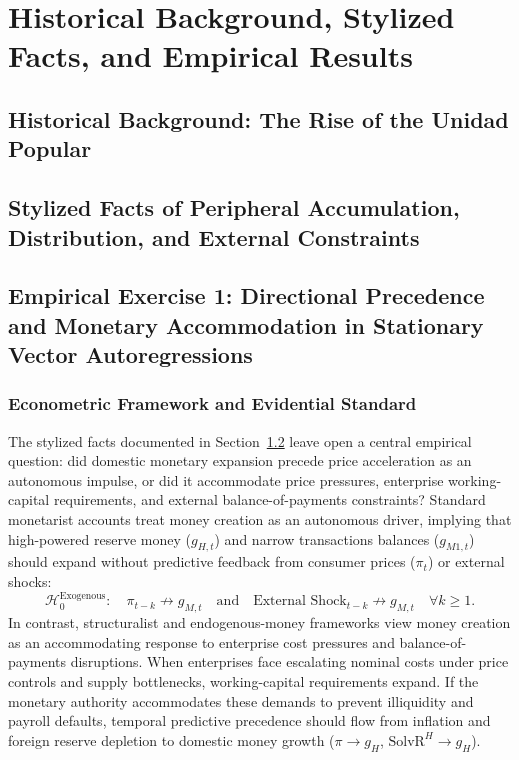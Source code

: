 \section{Historical Background, Stylized Facts, and Empirical Results}
\label{sec:historical_empirical_results}
\label{sec:empirical_tournament}
\label{sec:empirical_results}

\subsection{Historical Background: The Rise of the Unidad Popular}
\label{sec:historical_background}



\subsection{Stylized Facts of Peripheral Accumulation, Distribution, and External Constraints}
\label{sec:stylized_facts}



\subsection{Empirical Exercise 1: Directional Precedence and Monetary Accommodation in Stationary Vector Autoregressions}
\label{sec:granger_tournament}
\label{sec:granger_linear}

\subsubsection{Econometric Framework and Evidential Standard}
\label{sec:granger_methodology}
\label{sec:granger_unit_root}
\label{sec:granger_tournament_setup}

The stylized facts documented in Section~\ref{sec:stylized_facts} leave open a central empirical question: did domestic monetary expansion precede price acceleration as an autonomous impulse, or did it accommodate price pressures, enterprise working-capital requirements, and external balance-of-payments constraints? Standard monetarist accounts treat money creation as an autonomous driver, implying that high-powered reserve money ($g_{H,t}$) and narrow transactions balances ($g_{M1,t}$) should expand without predictive feedback from consumer prices ($\pi_t$) or external shocks:
\begin{equation}
    \mathcal{H}_0^{\text{Exogenous}}: \quad \pi_{t-k} \not\longrightarrow g_{M,t} \quad \text{and} \quad \text{External Shock}_{t-k} \not\longrightarrow g_{M,t} \quad \forall k \ge 1.
    \label{eq:null_exogeneity}
\end{equation}
In contrast, structuralist and endogenous-money frameworks view money creation as an accommodating response to enterprise cost pressures and balance-of-payments disruptions. When enterprises face escalating nominal costs under price controls and supply bottlenecks, working-capital requirements expand. If the monetary authority accommodates these demands to prevent illiquidity and payroll defaults, temporal predictive precedence should flow from inflation and foreign reserve depletion to domestic money growth ($\pi \to g_H$, $\text{SolvR}^H \to g_H$).

